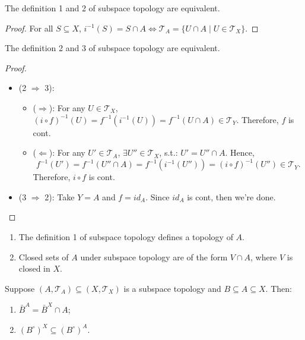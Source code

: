 \begin{proposition}
    The definition 1 and 2 of subspace topology are equivalent.
\end{proposition}

\begin{proof}
    For all $S \subseteq X$, $i^{-1}(S) = S\cap A \Leftrightarrow \mathcal{T}_A = \{U \cap A \mid U\in \mathcal{T}_X\}$.
\end{proof}

\begin{proposition}
    The definition 2 and 3 of subspace topology are equivalent.
\end{proposition}

\begin{proof}
    \begin{itemize}
        \item (2 $\Rightarrow$ 3): 
        \begin{itemize}
            \item ($\Rightarrow$): For any $U \in \mathcal{T}_X$, $(i\circ f)^{-1}(U) = f^{-1}(i^{-1}(U)) = f^{-1}(U \cap A) \in \mathcal{T}_Y$. Therefore, $f$ is cont.
            \item ($\Leftarrow$): For any $U' \in \mathcal{T}_A$, $\exists U'' \in \mathcal{T}_X$, s.t.: $U'= U'' \cap A$. Hence, $$f^{-1}(U') = f^{-1} (U''\cap A) = f^{-1} (i^{-1} (U''))= (i \circ f)^{-1} (U'') \in \mathcal{T}_Y.$$
            Therefore, $i\circ f$ is cont.
        \end{itemize}
        \item (3 $\Rightarrow$ 2): Take $Y=A$ and $f= id_A$. Since $id_A$ is cont, then we're done.
    \end{itemize}
\end{proof}

\begin{proposition}
    \begin{enumerate}
        \item The definition 1 of subspace topology defines a topology of $A$.
        \item Closed sets of $A$ under subspace topology are of the form $V\cap A$, where $V$ is closed in $X$.
    \end{enumerate}
\end{proposition}

\begin{proposition}
    Suppose $(A,\mathcal{T}_A) \subseteq (X,\mathcal{T}_X)$ is a subspace topology and $B \subseteq A \subseteq X$. Then:
    \begin{enumerate}
        \item $\bar{B}^A = \bar{B}^X \cap A$;
        \item $(B^\circ) ^X \subseteq (B^\circ) ^A$.
    \end{enumerate}
\end{proposition}

